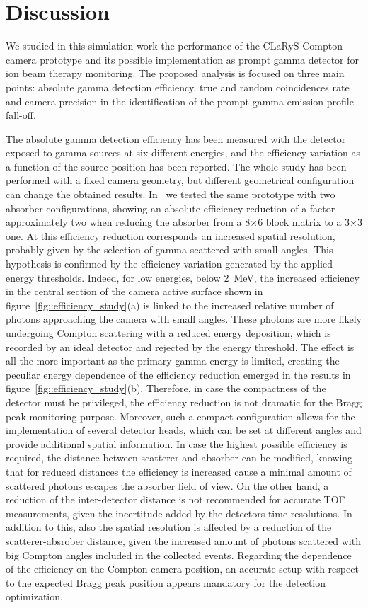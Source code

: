 \section{Discussion}

We studied in this simulation work the performance of the CLaRyS Compton camera prototype and its possible implementation as prompt gamma detector for ion beam therapy monitoring. The proposed analysis is focused on three main points: absolute gamma detection efficiency, true and random coincidences rate and camera precision in the identification of the prompt gamma emission profile fall-off.

The absolute gamma detection efficiency has been measured with the detector exposed to gamma sources at six different energies, and the efficiency variation as a function of the source position has been reported. The whole study has been performed with a fixed camera geometry, but different geometrical configuration can change the obtained results. In~\cite{Fontana_APPB} we tested the same prototype with two absorber configurations, showing an absolute efficiency reduction of a factor approximately two when reducing the absorber from a 8$\times$6 block matrix to a 3$\times$3 one. At this efficiency reduction corresponds an increased spatial resolution, probably given by the selection of gamma scattered with small angles. This hypothesis is confirmed by the efficiency variation generated by the applied energy thresholds. Indeed, for low energies, below 2~MeV, the increased efficiency in the central section of the camera active surface shown in figure~\ref{fig::efficiency_study}(a) is linked to the increased relative number of photons approaching the camera with small angles. These photons are more likely undergoing Compton scattering with a reduced energy deposition, which is recorded by an ideal detector and rejected by the energy threshold. The effect is all the more important as the primary gamma energy is limited, creating the peculiar energy dependence of the efficiency reduction emerged in the results in figure~\ref{fig::efficiency_study}(b). Therefore, in case the compactness of the detector must be privileged, the efficiency reduction is not dramatic for the Bragg peak monitoring purpose. Moreover, such a compact configuration allows for the implementation of several detector heads, which can be set at different angles and provide additional spatial information. In case the highest possible efficiency is required, the distance between scatterer and absorber can be modified, knowing that for reduced distances the efficiency is increased cause a minimal amount of scattered photons escapes the absorber field of view. On the other hand, a reduction of the inter-detector distance is not recommended for accurate TOF measurements, given the incertitude added by the detectors time resolutions. In addition to this, also the spatial resolution is affected by a reduction of the scatterer-absrober distance, given the increased amount of photons scattered with big Compton angles included in the collected events.   
Regarding the dependence of the efficiency on the Compton camera position, an accurate setup with respect to the expected Bragg peak position appears mandatory for the detection optimization.

